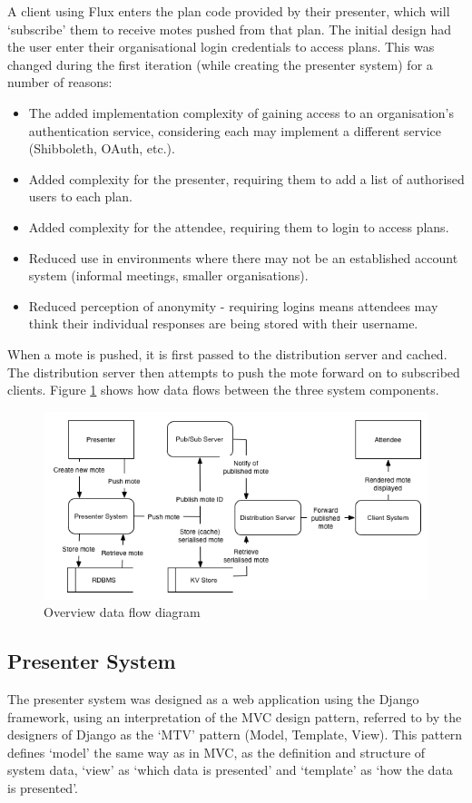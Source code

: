 \documentclass[a4papert,11pt,notitlepage]{article}
\begin{document}
A client using Flux enters the plan code provided by their presenter, which will `subscribe' them to receive motes pushed from that plan. The initial design had the user enter their organisational login credentials to access plans. This was changed during the first iteration (while creating the presenter system) for a number of reasons:
\begin{itemize}
\item The added implementation complexity of gaining access to an organisation's authentication service, considering each may implement a different service (Shibboleth\cite{shibboleth:web}, OAuth\cite{oauth:web}, etc.).
\item Added complexity for the presenter, requiring them to add a list of authorised users to each plan.
\item Added complexity for the attendee, requiring them to login to access plans.
\item Reduced use in environments where there may not be an established account system (informal meetings, smaller organisations).
\item Reduced perception of anonymity - requiring logins means attendees may think their individual responses are being stored with their username.
\end{itemize}

When a mote is pushed, it is first passed to the distribution server and cached. The distribution server then attempts to push the mote forward on to subscribed clients. Figure \ref{fig:dfd} shows how data flows between the three system components.

\begin{figure}[h]
\caption{Overview data flow diagram}
\label{fig:dfd}
\centering
\includegraphics[width=1\textwidth]{dfd}
\end{figure}

\subsection{Presenter System}
The presenter system was designed as a web application using the Django framework, using an interpretation of the MVC design pattern, referred to by the designers of Django as the `MTV' pattern (Model, Template, View). This pattern defines `model' the same way as in MVC, as the definition and structure of system data, `view' as `which data is presented' and `template' as `how the data is presented'\cite{djangomvcfaq:web}.
\end{document}
